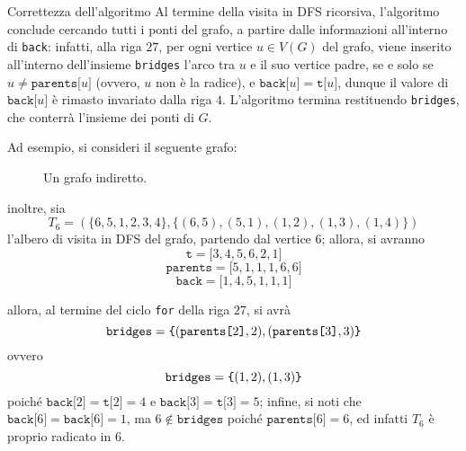 \documentclass[a4paper, 12pt]{report}
\begin{document}
\begin{framedobs}{Correttezza dell'algoritmo}
        Al termine della visita in DFS ricorsiva, l'algoritmo conclude cercando tutti i ponti del grafo, a partire dalle informazioni all'interno di \texttt{back}: infatti, alla riga $27$, per ogni vertice $u \in V(G)$ del grafo, viene inserito all'interno dell'insieme \texttt{bridges} l'arco tra $u$ e il suo vertice padre, se e solo se $u \neq \texttt{parents[}u\texttt{]}$ (ovvero, $u$ non è la radice), e $\texttt{back[}u\texttt{]} = \texttt{t[}u\texttt{]}$, dunque il valore di $\texttt{back[}u\texttt{]}$ è rimasto invariato dalla riga $4$. L'algoritmo termina restituendo \texttt{bridges}, che conterrà l'insieme dei ponti di $G$.

        Ad esempio, si consideri il seguente grafo:

        \begin{figure}[H]
            \centering
            \caption{Un grafo indiretto.}
        \end{figure}

        inoltre, sia $$T_6 = (\{6, 5, 1, 2, 3, 4\}, \{(6, 5), (5, 1), (1, 2), (1, 3), (1, 4)\})$$ l'albero di visita in DFS del grafo, partendo dal vertice $6$; allora, si avranno $$\texttt{t} = \texttt{[}3, 4, 5, 6, 2, 1\texttt{]}$$ $$\texttt{parents} = \texttt{[}5, 1, 1, 1, 6, 6\texttt{]}$$ $$\texttt{back} = \texttt{[}1, 4, 5, 1, 1, 1\texttt{]}$$

        allora, al termine del ciclo \texttt{for} della riga $27$, si avrà $$\texttt{bridges} = \verb|{| (\texttt{parents[}2\texttt{]}, 2), (\texttt{parents[}3\texttt{]}, 3)\verb|}|$$ ovvero $$\texttt{bridges} = \verb|{| (1, 2), (1, 3)\verb|}|$$ poiché $\texttt{back[}2\texttt{]} = \texttt{t[}2\texttt{]} = 4$ e $\texttt{back[}3\texttt{]} = \texttt{t[}3\texttt{]} = 5$; infine, si noti che $\texttt{back[}6\texttt{]} = \texttt{back[}6\texttt{]} = 1$, ma $6 \notin \texttt{bridges}$ poiché $\texttt{parents[}6\texttt{]} = 6$, ed infatti $T_6$ è proprio radicato in $6$.
    \end{framedobs}
\end{document}
